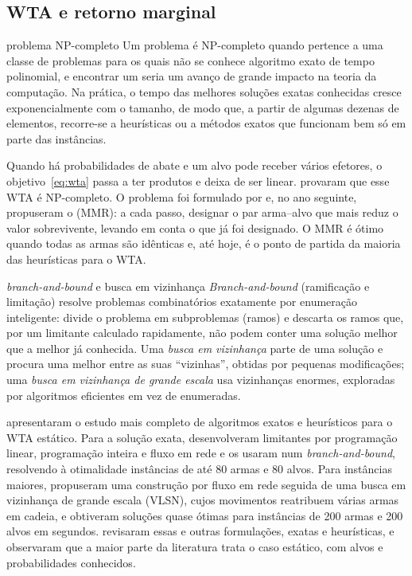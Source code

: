 \subsection{WTA e retorno marginal}

\begin{conceitobox}{problema NP-completo}
Um problema é NP-completo quando pertence a uma classe de problemas para os quais não se conhece algoritmo exato de tempo
polinomial, e encontrar um seria um avanço de grande impacto na teoria da computação. Na prática, o tempo das melhores
soluções exatas conhecidas cresce exponencialmente com o tamanho, de modo que, a partir de algumas dezenas de elementos,
recorre-se a heurísticas ou a métodos exatos que funcionam bem só em parte das instâncias.
\end{conceitobox}

Quando há probabilidades de abate e um alvo pode receber vários efetores, o objetivo~\eqref{eq:wta} passa a ter produtos e
deixa de ser linear. \citet{lloyd1986} provaram que esse WTA é NP-completo. O problema foi formulado por \citet{manne1958}
e, no ano seguinte, \citet{denbroeder1959} propuseram o  (MMR): a cada passo, designar o par
arma--alvo que mais reduz o valor sobrevivente, levando em conta o que já foi designado. O MMR é ótimo quando todas as
armas são idênticas e, até hoje, é o ponto de partida da maioria das heurísticas para o WTA.

\begin{conceitobox}{\emph{branch-and-bound} e busca em vizinhança}
\emph{Branch-and-bound} (ramificação e limitação) resolve problemas combinatórios exatamente por enumeração inteligente:
divide o problema em subproblemas (ramos) e descarta os ramos que, por um limitante calculado rapidamente, não podem conter
uma solução melhor que a melhor já conhecida. Uma \emph{busca em vizinhança} parte de uma solução e procura uma melhor entre
as suas ``vizinhas'', obtidas por pequenas modificações; uma \emph{busca em vizinhança de grande escala} usa vizinhanças
enormes, exploradas por algoritmos eficientes em vez de enumeradas.
\end{conceitobox}

\citet{ahuja2007} apresentaram o estudo mais completo de algoritmos exatos e heurísticos para o WTA estático. Para a
solução exata, desenvolveram limitantes por programação linear, programação inteira e fluxo em rede e os usaram num
\emph{branch-and-bound}, resolvendo à otimalidade instâncias de até 80 armas e 80 alvos. Para instâncias maiores, propuseram
uma construção por fluxo em rede seguida de uma busca em vizinhança de grande escala (VLSN), cujos movimentos reatribuem
várias armas em cadeia, e obtiveram soluções quase ótimas para instâncias de 200 armas e 200 alvos em segundos.
\citet{kline2019} revisaram essas e outras formulações, exatas e heurísticas, e observaram que a maior parte da literatura
trata o caso estático, com alvos e probabilidades conhecidos.

